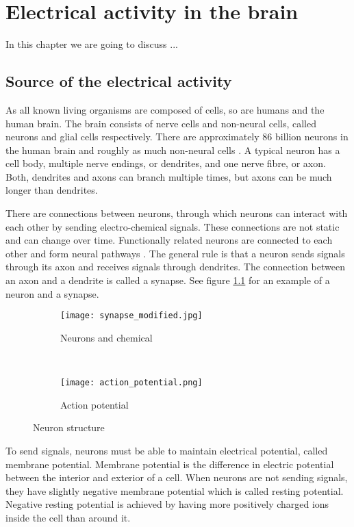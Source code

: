 
\chapter{Electrical activity in the brain}

In this chapter we are going to discuss ...

\section{Source of the electrical activity}
\label{sec:neuron}

As all known living organisms are composed of cells, so are humans and the human brain. The brain consists of nerve cells and non-neural cells, called neurons and glial cells respectively. There are approximately 86 billion neurons in the human brain and roughly as much non-neural cells \cite{neuroncount}. A typical neuron has a cell body, multiple nerve endings, or dendrites, and one nerve fibre, or axon. Both, dendrites and axons can branch multiple times, but axons can be much longer than dendrites. 

There are connections between neurons, through which neurons can interact with each other by sending electro-chemical signals. These connections are not static and can change over time. Functionally related neurons are connected to each other and form neural pathways \cite{neuralpathway}. The general rule is that a neuron sends signals through its axon and receives signals through dendrites. The connection between an axon and a dendrite is called a synapse. See figure \ref{fig:neuron_synapse} for an example of a neuron and a synapse.

\begin{figure}[b!]
	\centering
	\begin{subfigure}{0.48\textwidth}
		\texttt{[image: synapse\_modified.jpg]}
		\caption{Neurons and chemical \cite[p.~17]{neuronpic}}
		\label{fig:neuron_synapse}
	\end{subfigure}
	~
	\begin{subfigure}{0.48\textwidth}
		\texttt{[image: action\_potential.png]}
		\caption{Action potential \cite{action_potential_pic}}
		\label{fig:action_potential}
	\end{subfigure}
	\caption{Neuron structure}
\end{figure}

To send signals, neurons must be able to maintain electrical potential, called membrane potential. Membrane potential is the difference in electric potential between the interior and exterior of a cell. When neurons are not sending signals, they have slightly negative membrane potential which is called resting potential. Negative resting potential is achieved by having more positively charged ions inside the cell than around it.

